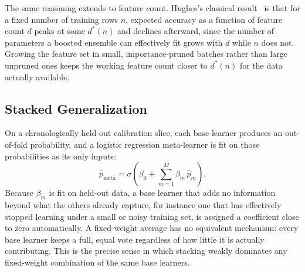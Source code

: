 \documentclass[conference]{IEEEtran}
\begin{document}
The same reasoning extends to feature count. Hughes's classical
result~\cite{hughes1968} is that for a fixed number of training rows
$n$, expected accuracy as a function of feature count $d$ peaks at
some $d^*(n)$ and declines afterward, since the number of parameters a
boosted ensemble can effectively fit grows with $d$ while $n$ does
not. Growing the feature set in small, importance-pruned batches
rather than large unpruned ones keeps the working feature count closer
to $d^*(n)$ for the data actually available.

\subsection{Stacked Generalization}
\label{sec:stack-math}

On a chronologically held-out calibration slice, each base learner
produces an out-of-fold probability, and a logistic regression
meta-learner is fit on those probabilities as its only inputs:
\begin{equation}
  \hat{p}_{\text{meta}} = \sigma\!\left(\beta_0 + \sum_{m=1}^{M} \beta_m\, \hat{p}_m\right).
\label{eq:meta}
\end{equation}
Because $\beta_m$ is fit on held-out data, a base learner that adds no
information beyond what the others already capture, for instance one
that has effectively stopped learning under a small or noisy training
set, is assigned a coefficient close to zero automatically. A
fixed-weight average has no equivalent mechanism: every base learner
keeps a full, equal vote regardless of how little it is actually
contributing. This is the precise sense in which stacking
\cite{wolpert1992} weakly dominates any fixed-weight combination of
the same base learners.
\end{document}
